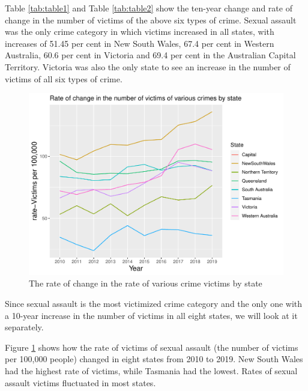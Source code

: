 \documentclass[11pt,a4paper,]{article}
\begin{document}
Table \ref{tab:table1} and Table \ref{tab:table2} show the ten-year change and rate of change in the number of victims of the above six types of crime. Sexual assault was the only crime category in which victims increased in all states, with increases of 51.45 per cent in New South Wales, 67.4 per cent in Western Australia, 60.6 per cent in Victoria and 69.4 per cent in the Australian Capital Territory. Victoria was also the only state to see an increase in the number of victims of all six types of crime.

\begin{figure}
\centering
\includegraphics{report_files/figure-latex/plot3-1.pdf}
\caption{\label{fig:plot3}The rate of change in the rate of various crime victims by state}
\end{figure}

Since sexual assault is the most victimized crime category and the only one with a 10-year increase in the number of victims in all eight states, we will look at it separately.

Figure \ref{fig:plot3} shows how the rate of victims of sexual assault (the number of victims per 100,000 people) changed in eight states from 2010 to 2019. New South Wales had the highest rate of victims, while Tasmania had the lowest. Rates of sexual assault victims fluctuated in most states.
\end{document}
